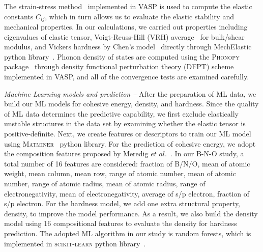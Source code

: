	The strain-stress method~\cite{PhysRevB.65.104104} implemented in VASP is used to compute the elastic constants $C_{ij}$, which in turn allows us to evaluate the elastic stability and mechanical properties. In our calculations, we carried out properties including eigenvalues of elastic tensor, Voigt-Reuss-Hill (VRH) average~\cite{voigt1928lehrbuch, reuss1929berechnung, hill1952elastic} for bulk/shear modulus, and Vickers hardness by Chen's model~\cite{chen2011modeling} directly through MechElastic python library~\cite{singh2018elastic, singh2021mechelastic}. Phonon density of states are computed using the \textsc{Phonopy} package~\cite{phonopy} through density functional perturbation theory (DFPT) scheme implemented in VASP, and all of the convergence tests are examined carefully.


	
	
	{\it Machine Learning models and prediction --} 
	After the preparation of ML data, we build our ML models for cohesive energy, density, and hardness. Since the quality of ML data determines the predictive capability, we first exclude elastically unstable structures in the data set by examining whether the elastic tensor is positive-definite. Next, we create features or descriptors to train our ML model using \textsc{Matminer}~\cite{matminer} python library. For the prediction of cohesive energy, we adopt the composition features proposed by Meredig $et$ $al.$~\cite{meredig2014combinatorial}. In our B-N-O study, a total number of 16 features are considered: fraction of B/N/O, mean of atomic weight, mean column, mean row, range of atomic number, mean of atomic number, range of atomic radius, mean of atomic radius, range of electronegativity, mean of electronegativity, average of s/p electron, fraction of s/p electron. For the hardness model, we add one extra structural property, density, to improve the model performance. As a result, we also build the density model using 16 compositional features to evaluate the density for hardness prediction. The adopted ML algorithm in our study is random forests, which is implemented in \textsc{scikit-learn} python library~\cite{scikit-learn}. 
    
